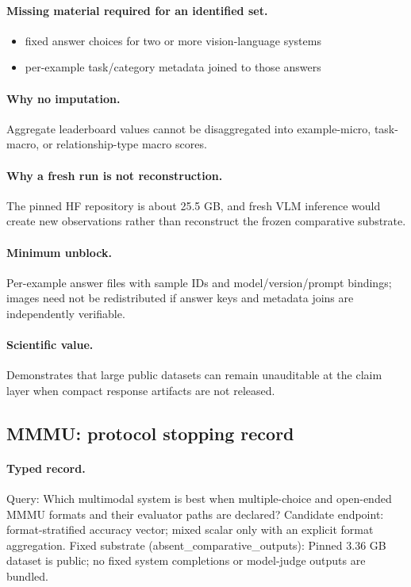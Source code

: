 \paragraph{Missing material required for an identified set.}
\begin{itemize}
  \item fixed answer choices for two or more vision-language systems
  \item per-example task/category metadata joined to those answers
\end{itemize}

\paragraph{Why no imputation.} Aggregate leaderboard values cannot be disaggregated into example-micro, task-macro, or relationship-type macro scores.

\paragraph{Why a fresh run is not reconstruction.} The pinned HF repository is about 25.5 GB, and fresh VLM inference would create new observations rather than reconstruct the frozen comparative substrate.

\paragraph{Minimum unblock.} Per-example answer files with sample IDs and model/version/prompt bindings; images need not be redistributed if answer keys and metadata joins are independently verifiable.

\paragraph{Scientific value.} Demonstrates that large public datasets can remain unauditable at the claim layer when compact response artifacts are not released.

\subsection{MMMU: protocol stopping record}\label{app:r8-mmmu}

\paragraph{Typed record.} Query: Which multimodal system is best when multiple-choice and open-ended MMMU formats and their evaluator paths are declared? Candidate endpoint: format-stratified accuracy vector; mixed scalar only with an explicit format aggregation. Fixed substrate (absent\_comparative\_outputs): Pinned 3.36 GB dataset is public; no fixed system completions or model-judge outputs are bundled.

